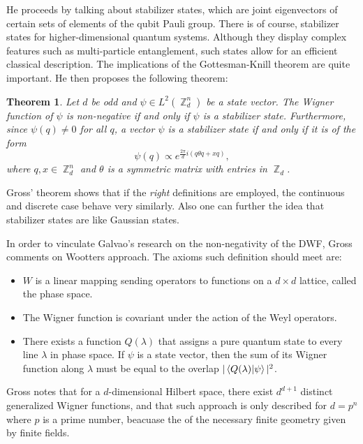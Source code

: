 \documentclass[a4paper]{article}
\DeclareMathOperator{\Z}{\mathbb{Z}}
\newtheorem{theorem}{Theorem}
\begin{document}
  He proceeds by talking about stabilizer states, which are
  joint eigenvectors of certain sets of elements of the
  qubit Pauli group. There is of course, stabilizer states
  for higher-dimensional quantum systems. Although they
  display complex features such as multi-particle
  entanglement, such states allow for an efficient classical
  description. The implications of the Gottesman-Knill
  theorem are quite important. He then proposes the
  following theorem:

  \begin{theorem}
    Let $d$ be odd and $\psi \in L^2(\Z_d^n)$ be a state
    vector. The Wigner function of $\psi$ is non-negative if
    and only if $\psi$ is a stabilizer state. Furthermore,
    since $\psi(q) \neq 0$ for all $q$, a vector $\psi$ is a
    stabilizer state if and only if it is of the form
    \[
      \psi(q) \propto e^{\frac{2\pi}{d}i (q\theta q + x q)},
    \] 
    where $q,x \in \Z_d^{n}$ and $\theta$ is a symmetric
    matrix with entries in $\Z_d$.
  \end{theorem}

  Gross' theorem shows that if the \textit{right}
  definitions are employed, the continuous and discrete case
  behave very similarly. Also one can further the idea that
  stabilizer states are like Gaussian states.

  In order to vinculate Galvao's research on the
  non-negativity of the DWF, Gross comments on Wootters
  approach. The axioms such definition should meet are:
  \begin{itemize}
    \item $W$ is a linear mapping sending operators to
      functions on a $d \times d$ lattice, called the phase
      space.
    \item The Wigner function is covariant under the action
      of the Weyl operators.
    \item There exists a function $Q(\lambda)$ that assigns
      a pure quantum state to every line $\lambda$ in phase
      space. If $\psi$ is a state vector, then the sum of
      its Wigner function along $\lambda$ must be equal to
      the overlap $|\braket{Q(\lambda)|\psi}|^2$.
  \end{itemize}

  Gross notes that for a $d$-dimensional Hilbert space,
  there exist $d^{d+1}$ distinct generalized Wigner
  functions, and that such approach is only described for $d
  = p^{n}$ where $p$ is a prime number, beacuase the of the
  necessary finite geometry given by finite fields.
\end{document}
